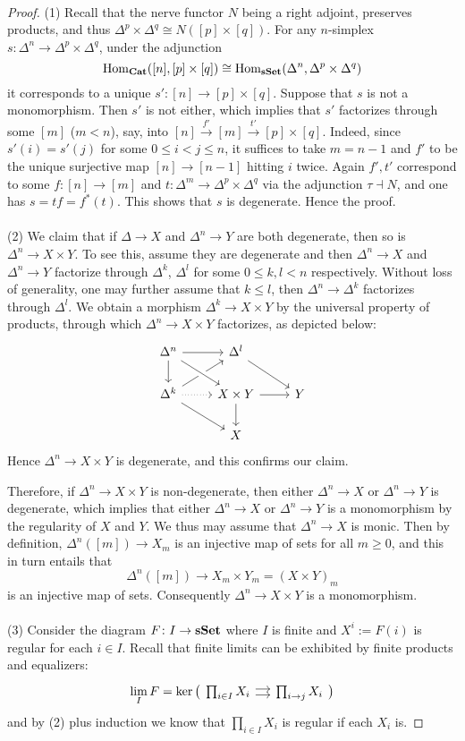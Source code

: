 \documentclass[a4paper,11pt,openany]{scrartcl}
\begin{document}
~\\
\begin{proof}
(1) Recall that the nerve functor $N$ being a right adjoint, preserves products, and thus $\Delta^p\times\Delta^q\cong N([p]\times[q])$. For any $n$-simplex $s\colon\Delta^n\to\Delta^p\times\Delta^q$, under the adjunction
\[
\operatorname{Hom}_{\operatorname{\mathbf{Cat}}}([n],[p]\times[q])\cong\operatorname{Hom}_{\operatorname{\mathbf{sSet}}}(\Delta^n,\Delta^p\times\Delta^q)
\]
it corresponds to a unique $s'\colon[n]\to[p]\times[q]$. Suppose that $s$ is not a monomorphism. Then $s'$ is not either, which implies that $s'$ factorizes through some $[m]$ ($m<n$), say, into $[n]\overset{f'}{\to}[m]\overset{t'}{\to}[p]\times[q]$. Indeed, since $s'(i)=s'(j)$ for some $0\leqslant i<j\leqslant n$, it suffices to take $m=n-1$ and $f'$ to be the unique surjective map $[n]\to[n-1]$ hitting $i$ twice. Again $f',t'$ correspond to some $f\colon[n]\to[m]$ and $t\colon\Delta^m\to\Delta^p\times\Delta^q$ via the adjunction $\tau\dashv N$, and one has $s=tf=f^*(t)$. This shows that $s$ is degenerate. Hence the proof.\\
\\
(2) We claim that if $\Delta\to X$ and $\Delta^n\to Y$ are both degenerate, then so is $\Delta^n\to X\times Y$. To see this, assume they are degenerate and then $\Delta^n\to X$ and $\Delta^n\to Y$ factorize through $\Delta^k$, $\Delta^l$ for some $0\leqslant k,l<n$ respectively. Without loss of generality, one may further assume that $k\leqslant l$, then $\Delta^n\to\Delta^k$ factorizes through $\Delta^l$. We obtain a morphism $\Delta^k\to X\times Y$ by the universal property of products, through which $\Delta^n\to X\times Y$ factorizes, as depicted below:
\[
\begin{tikzcd}
\Delta^n\arrow[r]\arrow[d]& \Delta^l\arrow[dr]\arrow[from=dl]&\\
\Delta^k\arrow[dr]\arrow[r,dotted]& X\times Y\arrow[r]\arrow[d]\arrow[from=ul,crossing over]& Y\\
& X&
\end{tikzcd}
\]
Hence $\Delta^n\to X\times Y$ is degenerate, and this confirms our claim.

Therefore, if $\Delta^n\to X\times Y$ is non-degenerate, then either $\Delta^n\to X$ or $\Delta^n\to Y$ is degenerate, which implies that either $\Delta^n\to X$ or $\Delta^n\to Y$ is a monomorphism by the regularity of $X$ and $Y$. We thus may assume that $\Delta^n\to X$ is monic. Then by definition, $\Delta^n([m])\to X_m$ is an injective map of sets for all $m\geqslant 0$, and this in turn entails that
\[
\Delta^n([m])\to X_m\times Y_m=(X\times Y)_m
\]
is an injective map of sets. Consequently $\Delta^n\to X\times Y$ is a monomorphism.\\
\\
(3) Consider the diagram $F\colon I\to\operatorname{\mathbf{sSet}}$ where $I$ is finite and $X^i:=F(i)$ is regular for each $i\in I$. Recall that finite limits can be exhibited by finite products and equalizers:
\[
\lim_IF=\ker\big(
\begin{tikzcd}[sep=small]
\prod_{i\in I}X_i\arrow[r,shift right]\arrow[r,shift left]&\prod_{i\to j}X_i
\end{tikzcd}\big)
\]
and by (2) plus induction we know that $\prod_{i\in I}X_i$ is regular if each $X_i$ is. 


\end{proof}
\end{document}
